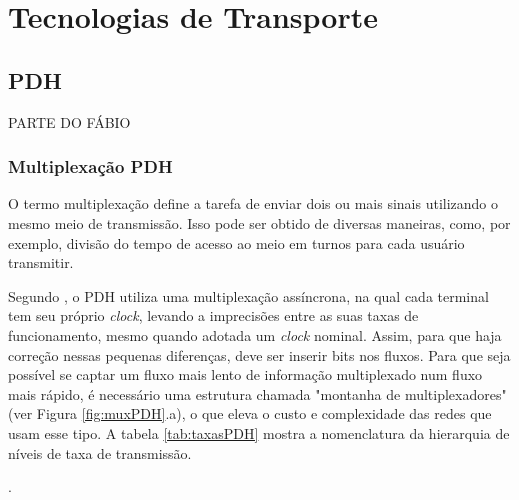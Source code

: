 \chapter{Tecnologias de Transporte}

\section{PDH}

PARTE DO FÁBIO

\subsection{Multiplexação PDH}

O termo multiplexação define a tarefa de enviar dois ou mais sinais utilizando o mesmo meio de transmissão. Isso pode ser obtido de diversas maneiras, como, por exemplo, divisão do tempo de acesso ao meio em turnos para cada usuário transmitir.

Segundo \cite{Ramaswami2010}, o PDH utiliza uma multiplexação assíncrona, na qual cada terminal tem seu próprio \textit{clock}, levando a imprecisões entre as suas taxas de funcionamento, mesmo quando adotada um \textit{clock} nominal. Assim, para que haja correção nessas pequenas diferenças, deve ser inserir bits nos fluxos. Para que seja possível se captar um fluxo mais lento de informação multiplexado num fluxo mais rápido, é necessário uma estrutura chamada "montanha de multiplexadores" (ver Figura \ref{fig:muxPDH}.a), o que eleva o custo e complexidade das redes que usam esse tipo. A tabela \ref{tab:taxasPDH} mostra a nomenclatura da hierarquia de níveis de taxa de transmissão.

\begin{table}
\centering
{}
\caption{\label{tab:taxasPDH}As taxas de transmissão de sinais assíncronos e quase-síncronos (como padronizado na América do Norte e na Europa). A sigla DS vem de "\textit{Digital Signal}". Adaptado de \cite{Ramaswami2010}.}.
\end{table}

